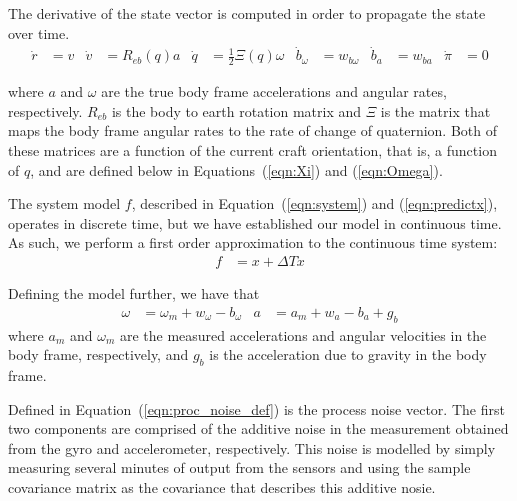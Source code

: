 \documentclass[]{article}
\begin{document}
{The derivative of the state vector is computed in order to propagate the state over time.
\begin{align}
	\label{eqn:xdotDef}
	\dot{r} &= v
	&
	\dot{v} &= R_{eb}(q) a
	&
	\dot{q} &= \frac{1}{2}\Xi(q) \omega
	&
	\dot{b}_\omega &= w_{b\omega}
	&
	\dot{b}_a &= w_{ba}
	&
	\dot{\pi} &= 0
\end{align}

where $a$ and $\omega$ are the true body frame accelerations and angular rates, respectively.
$R_{eb}$ is the body to earth rotation matrix and $\Xi$ is the matrix that maps the body frame angular rates to the rate of change of quaternion. Both of these matrices are a function of the current craft orientation, that is, a function of $q$, and are defined below in Equations~(\ref{eqn:Xi}) and (\ref{eqn:Omega}).

The system model $f$, described in Equation~(\ref{eqn:system}) and (\ref{eqn:predictx}), operates in discrete time, but we have established our model in continuous time. As such, we perform a first order approximation to the continuous time system:
\begin{align}
	f &= x + \Delta T \dot{x}
	\label{eqn:descrete_f}
\end{align}

Defining the model further, we have that
\begin{align}
	\omega &= \omega_m + w_\omega - b_\omega &
	a &= a_m + w_a - b_a + g_b
\end{align}
where $a_m$ and $\omega_m$ are the measured accelerations and angular velocities in the body frame, respectively, and $g_b$ is the acceleration due to gravity in the body frame.

Defined in Equation~(\ref{eqn:proc_noise_def}) is the process noise vector. The first two components are comprised of the additive noise in the measurement obtained from the gyro and accelerometer, respectively. This noise is modelled by simply measuring several minutes of output from the sensors and using the sample covariance matrix as the covariance that describes this additive nosie.

}
\end{document}
